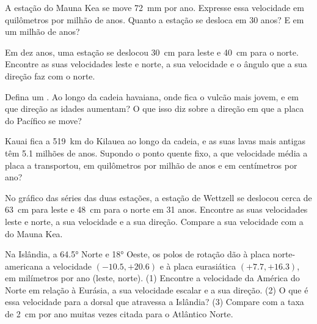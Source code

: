 \begin{exercise}[$\star$]\label{exo:g11:plate-motions:2}
A estação do Mauna Kea se move \qty{72}{mm} por ano. Expresse essa
velocidade em quilômetros por milhão de anos. Quanto a estação se desloca em
30 anos? E em um milhão de anos?
\end{exercise}

\begin{exercise}[$\star$]\label{exo:g11:plate-motions:3}
Em dez anos, uma estação se deslocou \qty{30}{cm} para leste e \qty{40}{cm}
para o norte. Encontre as suas velocidades leste e norte, a sua velocidade e
o ângulo que a sua direção faz com o norte.
\end{exercise}

\begin{exercise}[$\star$]\label{exo:g11:plate-motions:4}
Defina um . Ao longo da cadeia havaiana, onde fica o
vulcão mais jovem, e em que direção as idades aumentam? O que isso diz sobre
a direção em que a placa do Pacífico se move?
\end{exercise}

\begin{exercise}[$\star$]\label{exo:g11:plate-motions:5}
Kauai fica a \qty{519}{km} do Kilauea ao longo da cadeia, e as suas lavas
mais antigas têm \num{5.1} milhões de anos. Supondo o ponto quente fixo, a
que velocidade média a placa a transportou, em quilômetros por milhão de
anos e em centímetros por ano?
\end{exercise}

\begin{exercise}[$\star\star$]\label{exo:g11:plate-motions:6}
No gráfico das séries das duas estações, a estação de Wettzell se deslocou
cerca de \qty{63}{cm} para leste e \qty{48}{cm} para o norte em 31 anos.
Encontre as suas velocidades leste e norte, a sua velocidade e a sua
direção. Compare a sua velocidade com a do Mauna Kea.
\end{exercise}

\begin{exercise}[$\star\star$]\label{exo:g11:plate-motions:7}
Na Islândia, a \ang{64.5} Norte e \ang{18} Oeste, os polos de rotação dão à
placa norte-americana a velocidade $(-10.5, +20.6)$ e à placa eurasiática
$(+7.7, +16.3)$, em milímetros por ano (leste, norte). (1) Encontre a
velocidade da América do Norte em relação à Eurásia, a sua velocidade
escalar e a sua direção. (2) O que é essa velocidade para a dorsal que
atravessa a Islândia? (3) Compare com a taxa de \qty{2}{cm} por ano muitas
vezes citada para o Atlântico Norte.
\end{exercise}

